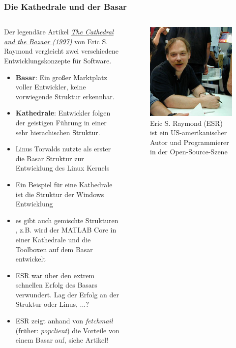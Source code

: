 \documentclass{beamer}
\begin{document}
\begin{frame}\frametitle{Die Kathedrale und der Basar}
\begin{columns}
 \begin{scriptsize}        
        Der legendäre Artikel \href{http://www.catb.org/~esr/writings/cathedral-bazaar/hacker-history/hacker-history.ps}{\textit{The Cathedral and the Bazaar (1997)}} von Eric S. Raymond vergleicht zwei verschiedene Entwicklungskonzepte für Software. 
        
     
  \begin{itemize}
        \item \textbf{Basar}: Ein großer Marktplatz voller Entwickler, keine vorwiegende Struktur erkennbar.
        \item \textbf{Kathedrale}: Entwickler folgen der geistigen Führung in einer sehr hierachischen Struktur. 
		\item Linus Torvalds nutzte als erster die Basar Struktur zur Entwicklung des Linux Kernels
		\item Ein Beispiel für eine Kathedrale ist die Struktur der Windows Entwicklung		
		\item es gibt auch gemischte Strukturen , z.B. wird der MATLAB Core in einer Kathedrale und die Toolboxen auf dem Basar entwickelt 
		\item ESR war über den extrem schnellen Erfolg des Basars verwundert. Lag der Erfolg an der Struktur oder Linus, ...?
		\item ESR zeigt anhand von \textit{fetchmail} (früher: \textit{popclient}) die Vorteile von einem Basar auf, siehe Artikel!
\end{itemize}
\end{scriptsize}
    
\begin{figure} 
\includegraphics[scale=.45]{Bilder/esr.jpg}
\caption{{\scriptsize Eric S. Raymond (ESR) ist ein US-amerikanischer Autor und Programmierer in der Open-Source-Szene}}
\end{figure}

\end{columns}
\end{frame}
\end{document}
